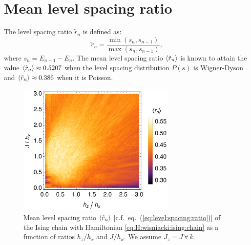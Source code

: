 \documentclass[10pt,letterpaper]{article}
\newcommand{\eref}[1]{eq.~(\ref{#1})}
\begin{document}
\section{Mean level spacing ratio}
The level spacing ratio $\tilde r_n$ is defined as:
\begin{equation}\label{eq:level:spacing:ratio}
\tilde r_n= 
\frac{\min(s_n, s_{n-1})}{\max(s_n, s_{n-1})}, 
\end{equation}
where $s_n = E_{n+1} - E_n$. The mean level spacing ratio $\expval{\tilde r_n}$ is 
known to attain the value $\expval{\tilde r_n} \approx 0.5207$ when the 
level spacing distribution $P(s)$ is Wigner-Dyson and
$\expval{\tilde r_n} \approx 0.386$ when it is Poisson.

\begin{figure}
\centering
\includegraphics[width=0.7\textwidth]{mean_level_spacing_ratio.png}
\caption{Mean level spacing ratio $\expval{\tilde r_n}$ 
[c.f.~\eref{eq:level:spacing:ratio}] of the Ising chain 
with Hamiltonian \eqref{eq:H:wisniacki:ising:chain} as a function of ratios 
$h_z/h_x$ and $J/h_x$. We assume $J_z=J\, \forall\,k$.}
\label{fig:mean:level:spacing:ratio}
\end{figure}
\end{document}
